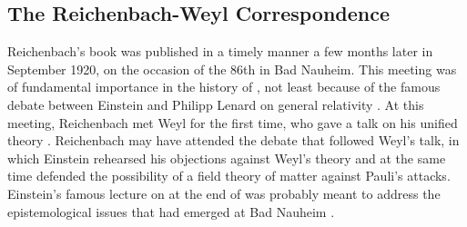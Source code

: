\documentclass[final]{article}
\newcommand{\WT}{Weyl's theory\xspace}
\begin{document}

\subsection{The Reichenbach-Weyl Correspondence}

Reichenbach's book was published in a timely manner a few months later in September 1920, on the occasion of the 86th  in Bad Nauheim. This meeting was of fundamental importance in the history of \rt, not least because of the famous debate between Einstein and Philipp Lenard on general relativity \citep{Dongen2007}. At this meeting, Reichenbach met Weyl for the first time, who gave a talk on his unified theory \citep{Weyl1920}. Reichenbach may have attended the debate that followed Weyl's talk, in which Einstein rehearsed his objections against \WT and at the same time defended the possibility of a field theory of matter against Pauli's attacks. Einstein's famous lecture on  at the end of   was probably meant to address the epistemological issues that had emerged at Bad Nauheim \citep{Giovanelli2014a}. 
\end{document}

